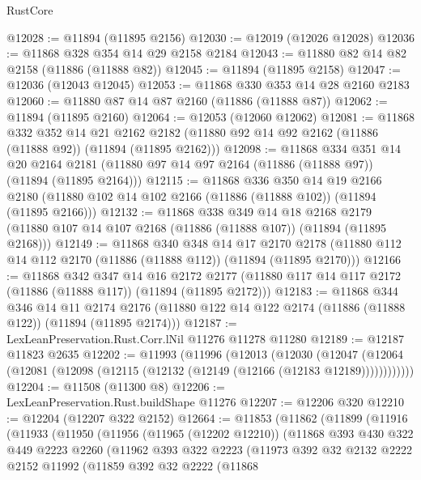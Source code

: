 \begin{lexlean}{RustCore}
\begin{coremodule}
@12028 := @11894 (@11895 @2156)
@12030 := @12019 (@12026 @12028)
@12036 := @11868 @328 @354 @14 @29 @2158 @2184
@12043 := @11880 @82 @14 @82 @2158 (@11886 (@11888 @82))
@12045 := @11894 (@11895 @2158)
@12047 := @12036 (@12043 @12045)
@12053 := @11868 @330 @353 @14 @28 @2160 @2183
@12060 := @11880 @87 @14 @87 @2160 (@11886 (@11888 @87))
@12062 := @11894 (@11895 @2160)
@12064 := @12053 (@12060 @12062)
@12081 := @11868
    @332
    @352
    @14
    @21
    @2162
    @2182
    (@11880 @92 @14 @92 @2162 (@11886 (@11888 @92)) (@11894 (@11895 @2162)))
@12098 := @11868
    @334
    @351
    @14
    @20
    @2164
    @2181
    (@11880 @97 @14 @97 @2164 (@11886 (@11888 @97)) (@11894 (@11895 @2164)))
@12115 := @11868
    @336
    @350
    @14
    @19
    @2166
    @2180
    (@11880 @102 @14 @102 @2166 (@11886 (@11888 @102)) (@11894 (@11895 @2166)))
@12132 := @11868
    @338
    @349
    @14
    @18
    @2168
    @2179
    (@11880 @107 @14 @107 @2168 (@11886 (@11888 @107)) (@11894 (@11895 @2168)))
@12149 := @11868
    @340
    @348
    @14
    @17
    @2170
    @2178
    (@11880 @112 @14 @112 @2170 (@11886 (@11888 @112)) (@11894 (@11895 @2170)))
@12166 := @11868
    @342
    @347
    @14
    @16
    @2172
    @2177
    (@11880 @117 @14 @117 @2172 (@11886 (@11888 @117)) (@11894 (@11895 @2172)))
@12183 := @11868
    @344
    @346
    @14
    @11
    @2174
    @2176
    (@11880 @122 @14 @122 @2174 (@11886 (@11888 @122)) (@11894 (@11895 @2174)))
@12187 := LexLeanPreservation.Rust.Corr.lNil @11276 @11278 @11280
@12189 := @12187 @11823 @2635
@12202 := @11993
    (@11996
      (@12013
        (@12030
          (@12047 (@12064 (@12081 (@12098 (@12115 (@12132 (@12149 (@12166 (@12183 @12189))))))))))))
@12204 := @11508 (@11300 @8)
@12206 := LexLeanPreservation.Rust.buildShape @11276
@12207 := @12206 @320
@12210 := @12204 (@12207 @322 @2152)
@12664 := @11853
    (@11862
      (@11899
        (@11916
          (@11933
            (@11950
              (@11956
                (@11965 (@12202 @12210))
                (@11868
                  @393
                  @430
                  @322
                  @449
                  @2223
                  @2260
                  (@11962
                    @393
                    @322
                    @2223
                    (@11973
                      @392
                      @32
                      @2132
                      @2222
                      @2152
                      @11992
                      (@11859
                        @392
                        @32
                        @2222
                        (@11868

\end{coremodule}
\end{lexlean}
